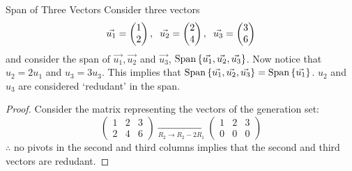 \begin{example}{Span of Three Vectors}{}
    Consider three vectors
    \[
        \vec{u_1} = \begin{pmatrix}
            1 \\ 2
        \end{pmatrix},
        \hspace{0.2cm}
        \vec{u_2} = \begin{pmatrix}
            2 \\ 4
        \end{pmatrix}, 
        \hspace{0.2cm}
        \vec{u_3} = \begin{pmatrix}
            3 \\ 6
        \end{pmatrix}
    \]
    and consider the span of $\vec{u_1}, \vec{u_2}$ and $\vec{u_3}$, $\text{Span}\left\{\vec{u_1}, \vec{u_2}, \vec{u_3} \right\}$. Now notice that $u_2 = 2u_1$ and $u_3 = 3u_3$. This implies that $\text{Span}\left\{\vec{u_1}, \vec{u_2}, \vec{u_3} \right\} = \text{Span}\left\{\vec{u_1} \right\}$. $u_2$ and $u_3$ are considered `redudant' in the span.
    \begin{proof}
        Consider the matrix representing the vectors of the generation set:
        \[
            \begin{pmatrix}
                1 & 2 & 3 \\
                2 & 4 & 6
            \end{pmatrix}
            \xrightarrow[R_2 \to R_2 - 2R_1]{}
            \begin{pmatrix}
                1 & 2 & 3 \\
                0 & 0 & 0
            \end{pmatrix}
        \]
        $\therefore$ no pivots in the second and third columns implies that the second and third vectors are redudant. 
    \end{proof}
\end{example}


